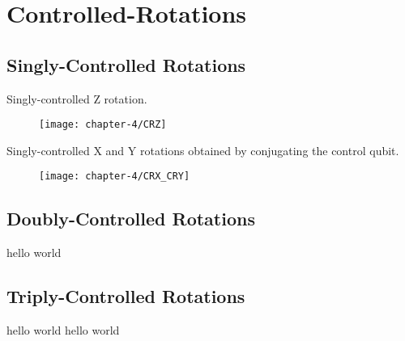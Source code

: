 \section{Controlled-Rotations}

\subsection{Singly-Controlled Rotations}
Singly-controlled Z rotation.

\begin{figure}[hb]
    \centering
    \texttt{[image: chapter-4/CRZ]}
\end{figure}

Singly-controlled X and Y rotations obtained by conjugating the control qubit.

\begin{figure}[hb]
    \centering
    \texttt{[image: chapter-4/CRX\_CRY]}
\end{figure}

\subsection{Doubly-Controlled Rotations}
hello world


\subsection{Triply-Controlled Rotations}
hello world
hello world
